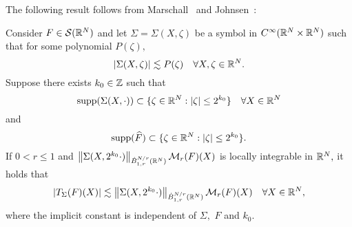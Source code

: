 The following result follows from   Marschall~\cite[p.118, Proposition 5(a)]{MR1376592} and  Johnsen~\cite[p.275, Proposition 4.1]{MR2163627}:

\begin{lem}\label{lem:Marschall} Consider $F\in \mathcal{S}(\mathbb{R}^N)$ and let $\Sigma=\Sigma(X, \zeta)$ be a  symbol in $C^\infty(\mathbb{R}^N \times \mathbb{R}^N)$ such that for some polynomial $P(\zeta),$
\[
\left\vert \Sigma(X, \zeta) \right\vert\lesssim P(\zeta)\quad \forall X,\zeta\in\mathbb{R}^N.
\]
Suppose there exists $k_0\in \mathbb{Z}$ such that
$$
{\rm{supp}} (\Sigma(X, \cdot)) \subset  \{ \zeta \in \mathbb{R}^N:  |\zeta| \le 2^{k_0}\}\quad \forall X\in \mathbb{R}^N
$$
and
$$
{\rm{supp}}(\widehat{F})  \subset  \{ \zeta \in \mathbb{R}^N:  |\zeta| \le 2^{k_0}\}.
$$
If $0<r \le 1$ and $\left\|\Sigma(X, 2^{k_0} \cdot)\right\|_{\dot{B}^{N/r}_{1,r}(\mathbb{R}^N)} \mathcal{M}_r(F)(X)$ is locally integrable in $\mathbb{R}^N,$ it holds that
\begin{equation}\label{eq:Marschall:N}
|T_{\Sigma}(F)(X)| \lesssim \left\|\Sigma(X, 2^{k_0} \cdot)\right\|_{\dot{B}^{N/r}_{1,r}(\mathbb{R}^N)} \mathcal{M}_r(F)(X) \quad \forall X \in \mathbb{R}^N,
\end{equation}
where the implicit constant is independent of $\Sigma,$ $F$ and $k_0.$
\end{lem}

